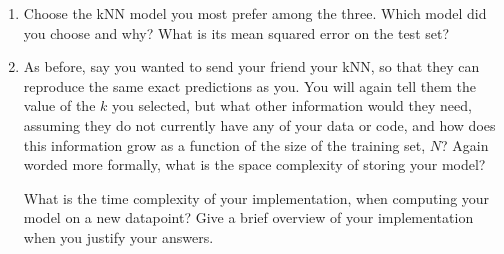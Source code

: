 \documentclass[submit]{harvardml}
\begin{document}
\begin{problem}
\begin{enumerate}
\item Choose the kNN model you most prefer among the three. Which model did you choose and why? What is its mean squared error on the test set?

\item As before, say you wanted to send your friend your kNN, so that they can reproduce the same exact predictions as you. You will again tell them the value of the $k$ you selected, but what other information would they need, assuming they do not currently have any of your data or code, and how does this information grow as a function of the size of the training set, $N$? Again worded more formally, what is the space complexity of storing your model?

What is the time complexity of your implementation, when computing your model on a new datapoint? Give a brief overview of your implementation when you justify your answers. 
\end{enumerate}

\end{problem}

\end{document}
